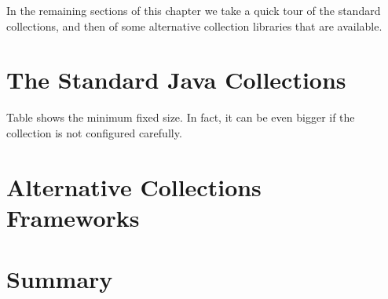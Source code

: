 In the remaining sections of this chapter we take a quick tour of the standard
collections, and then of some alternative collection libraries that are
available.

\section{The Standard Java Collections}
Table shows the minimum fixed size.  In fact, it can be even bigger if the
collection is not configured carefully.
\section{Alternative Collections Frameworks}

\section{Summary}

